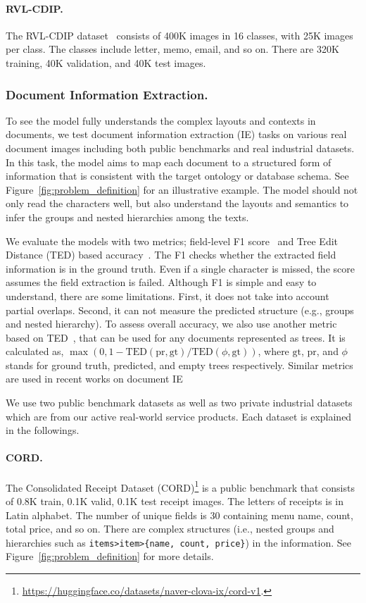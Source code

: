 \documentclass[runningheads]{llncs}
\begin{document}
\paragraph{RVL-CDIP.}
The RVL-CDIP dataset~\cite{harley2015icdar} consists of 400K images in 16 classes, with 25K images per class. The classes include letter, memo, email, and so on. There are 320K training, 40K validation, and 40K test images. 

\subsubsection{Document Information Extraction.}
To see the model fully understands the complex layouts and contexts in documents, we test document information extraction (IE) tasks on various real document images including both public benchmarks and real industrial datasets.
In this task, the model aims to map each document to a structured form of information that is consistent with the target ontology or database schema. See Figure~\ref{fig:problem_definition} for an illustrative example. The model should not only read the characters well, but also understand the layouts and semantics to infer the groups and nested hierarchies among the texts.

We evaluate the models with two metrics; field-level F1 score~\cite{hwang2019pot,xu2019_layoutLM,hong2021bros} and Tree Edit Distance (TED) based accuracy~\cite{ted,teds,hwang2021costeffective}.
The F1 checks whether the extracted field information is in the ground truth. Even if a single character is missed, the score assumes the field extraction is failed.
Although F1 is simple and easy to understand, there are some limitations. First, it does not take into account partial overlaps. Second, it can not measure the predicted structure (e.g., groups and nested hierarchy).
To assess overall accuracy, we also use another metric based on TED~\cite{ted}, that can be used for any documents represented as trees. It is calculated as, $\max(0, 1-\text{TED}(\text{pr},\text{gt})/\text{TED}(\phi,\text{gt}))$, where $\text{gt}$, $\text{pr}$, and $\phi$ stands for ground truth, predicted, and empty trees respectively. Similar metrics are used in recent works on document IE~\cite{teds,hwang2021costeffective}

We use two public benchmark datasets as well as two private industrial datasets which are from our active real-world service products.
Each dataset is explained in the followings.

\paragraph{CORD.}
The Consolidated Receipt Dataset (CORD)\footnote{\url{https://huggingface.co/datasets/naver-clova-ix/cord-v1}.}\cite{park2019cord} is a public benchmark that consists of 0.8K train, 0.1K valid, 0.1K test receipt images.
The letters of receipts is in Latin alphabet.
The number of unique fields is 30 containing menu name, count, total price, and so on.
There are complex structures (i.e., nested groups and hierarchies such as \texttt{\small items>item>{\scriptsize\{}name, count, price{\scriptsize\}}}) in the information.
See Figure~\ref{fig:problem_definition} for more details.
\end{document}
